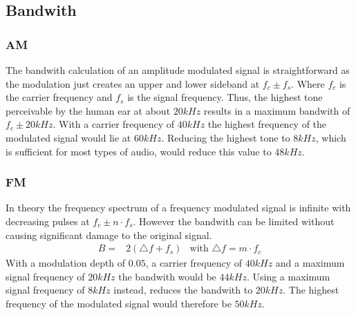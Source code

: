 \subsection{Bandwith}

\subsubsection*{AM}

The bandwith calculation of an amplitude modulated signal is straightforward as the modulation just creates an upper and lower sideband at $f_c \pm f_s$.\cite{netzberger_kommunikationstechnologie_2021-1} Where $f_c$ is the carrier frequency and $f_s$ is the signal frequency.\p
Thus, the highest tone perceivable by the human ear at about $20kHz$ results in a maximum bandwith of $f_c \pm 20kHz$. With a carrier frequency of $40kHz$ the highest frequency of the modulated signal would lie at $60kHz$. Reducing the highest tone to $8kHz$, which is sufficient for most types of audio, would reduce this value to $48kHz$.

\subsubsection*{FM}

In theory the frequency spectrum of a frequency modulated signal is infinite with decreasing pulses at $f_c \pm n \cdot f_s$. However the bandwith can be limited without causing significant damage to the original signal.\cite{netzberger_kommunikationstechnologie_2021-1}
%
\begin{align}
  B =& 2 (\triangle f + f_s) &\textrm{with~} \triangle f = m \cdot f_c
\end{align}
%
With a modulation depth of $0.05$, a carrier frequency of $40kHz$ and a maximum signal frequency of $20kHz$ the bandwith would be $44kHz$. Using a maximum signal frequency of $8kHz$ instead, reduces the bandwith to $20kHz$. The highest frequency of the modulated signal would therefore be $50kHz$.